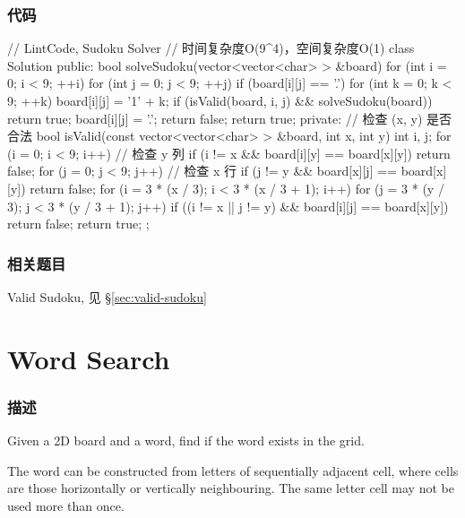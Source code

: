\subsubsection{代码}
\begin{Code}
// LintCode, Sudoku Solver
// 时间复杂度O(9^4)，空间复杂度O(1)
class Solution {
public:
    bool solveSudoku(vector<vector<char> > &board) {
        for (int i = 0; i < 9; ++i)
            for (int j = 0; j < 9; ++j) {
                if (board[i][j] == '.') {
                    for (int k = 0; k < 9; ++k) {
                        board[i][j] = '1' + k;
                        if (isValid(board, i, j) && solveSudoku(board))
                            return true;
                        board[i][j] = '.';
                    }
                    return false;
                }
            }
        return true;
    }
private:
    // 检查 (x, y) 是否合法
    bool isValid(const vector<vector<char> > &board, int x, int y) {
        int i, j;
        for (i = 0; i < 9; i++) // 检查 y 列
            if (i != x && board[i][y] == board[x][y])
                return false;
        for (j = 0; j < 9; j++) // 检查 x 行
            if (j != y && board[x][j] == board[x][y])
                return false;
        for (i = 3 * (x / 3); i < 3 * (x / 3 + 1); i++)
            for (j = 3 * (y / 3); j < 3 * (y / 3 + 1); j++)
                if ((i != x || j != y) && board[i][j] == board[x][y])
                    return false;
        return true;
    }
};
\end{Code}


\subsubsection{相关题目}
\begindot
\item Valid Sudoku, 见 \S \ref{sec:valid-sudoku}
\myenddot


\section{Word Search} %
\label{sec:word-search}


\subsubsection{描述}
Given a 2D board and a word, find if the word exists in the grid.

The word can be constructed from letters of sequentially adjacent cell, where  cells are those horizontally or vertically neighbouring. The same letter cell may not be used more than once.

